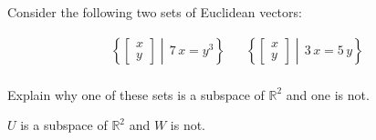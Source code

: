 
\begin{exerciseStatement}


Consider the following two sets of Euclidean vectors: 


\begin{align*}  \left\{ \left[\begin{array}{c}
x \\
y
\end{array}\right] \middle|\,7 \, x = y^{3}\right\}  & &   \left\{ \left[\begin{array}{c}
x \\
y
\end{array}\right] \middle|\,3 \, x = 5 \, y\right\}  \\ \end{align*}
            

 Explain why one of these sets is a subspace of \(\mathbb{R}^ 2 \) and one is not. 


\end{exerciseStatement}
    
\begin{exerciseAnswer} 


\(U\) is a subspace of \(\mathbb{R}^ 2 \) and \(W\) is not.


\end{exerciseAnswer}
    
